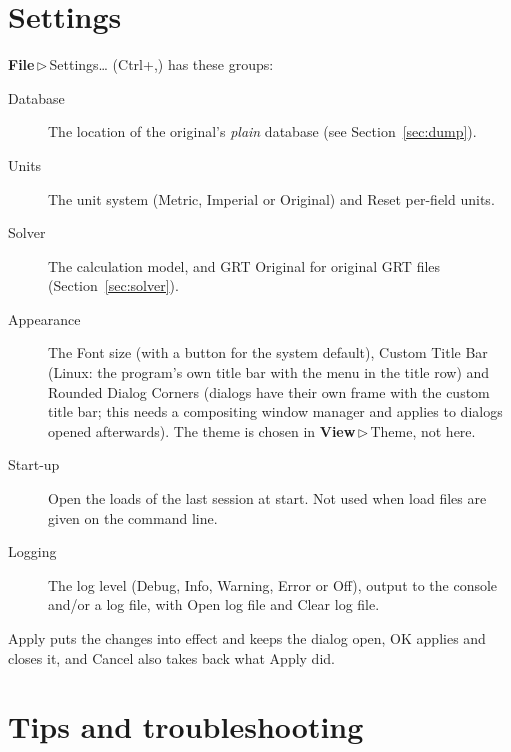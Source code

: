 \documentclass[11pt,a4paper]{article}
\newcommand{\ui}[1]{\textsf{#1}}
\newcommand{\menu}[1]{\textsf{\textbf{#1}}}
\newcommand{\sep}{\,$\triangleright$\,}
\begin{document}
\section{Settings}

\menu{File}\sep\ui{Settings\dots} (Ctrl+,) has these groups:
\begin{description}
  \item[Database] The location of the original's \emph{plain} database (see Section~\ref{sec:dump}).
  \item[Units] The unit system (Metric, Imperial or Original) and \ui{Reset per-field units}.
  \item[Solver] The calculation model, and GRT Original for original GRT files (Section~\ref{sec:solver}).
  \item[Appearance] The \ui{Font size} (with a button for the system default), \ui{Custom Title Bar} (Linux: the program's own title bar with the menu
        in the title row) and \ui{Rounded Dialog Corners} (dialogs have their own frame with the custom title bar; this needs a compositing window
        manager and applies to dialogs opened afterwards). The theme is chosen in \menu{View}\sep\ui{Theme}, not here.
  \item[Start-up] \ui{Open the loads of the last session at start}. Not used when load files are given on the command line.
  \item[Logging] The log level (Debug, Info, Warning, Error or Off), output to the console and/or a log file, with \ui{Open log file} and \ui{Clear log file}.
\end{description}
\ui{Apply} puts the changes into effect and keeps the dialog open, \ui{OK} applies and closes it, and \ui{Cancel} also takes back what \ui{Apply} did.

\section{Tips and troubleshooting}
\end{document}
